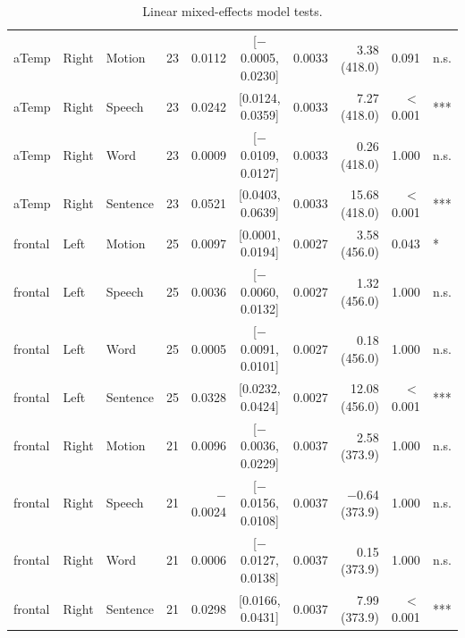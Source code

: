 \begin{table}[h]
\begin{tabular}{lllrrcrrrl}
aTemp & Right & Motion & 23 & 0.0112 & [$-$0.0005, 0.0230] & 0.0033 & 3.38 (418.0) & 0.091 & n.s. \\
aTemp & Right & Speech & 23 & 0.0242 & [0.0124, 0.0359] & 0.0033 & 7.27 (418.0) & $<$0.001 & *** \\
aTemp & Right & Word & 23 & 0.0009 & [$-$0.0109, 0.0127] & 0.0033 & 0.26 (418.0) & 1.000 & n.s. \\
aTemp & Right & Sentence & 23 & 0.0521 & [0.0403, 0.0639] & 0.0033 & 15.68 (418.0) & $<$0.001 & *** \\
frontal & Left & Motion & 25 & 0.0097 & [0.0001, 0.0194] & 0.0027 & 3.58 (456.0) & 0.043 & * \\
frontal & Left & Speech & 25 & 0.0036 & [$-$0.0060, 0.0132] & 0.0027 & 1.32 (456.0) & 1.000 & n.s. \\
frontal & Left & Word & 25 & 0.0005 & [$-$0.0091, 0.0101] & 0.0027 & 0.18 (456.0) & 1.000 & n.s. \\
frontal & Left & Sentence & 25 & 0.0328 & [0.0232, 0.0424] & 0.0027 & 12.08 (456.0) & $<$0.001 & *** \\
frontal & Right & Motion & 21 & 0.0096 & [$-$0.0036, 0.0229] & 0.0037 & 2.58 (373.9) & 1.000 & n.s. \\
frontal & Right & Speech & 21 & $-$0.0024 & [$-$0.0156, 0.0108] & 0.0037 & $-$0.64 (373.9) & 1.000 & n.s. \\
frontal & Right & Word & 21 & 0.0006 & [$-$0.0127, 0.0138] & 0.0037 & 0.15 (373.9) & 1.000 & n.s. \\
frontal & Right & Sentence & 21 & 0.0298 & [0.0166, 0.0431] & 0.0037 & 7.99 (373.9) & $<$0.001 & *** \\
\bottomrule
\end{tabular}
\caption{Linear mixed-effects model tests.}
\end{table}
